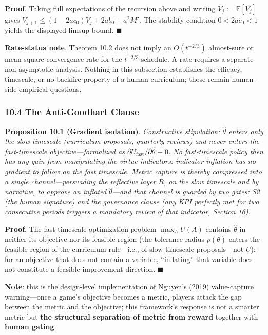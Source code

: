 \documentclass[
  11pt]{article}
\begin{document}
\textbf{Proof}. Taking full expectations of the recursion above and
writing \(\bar V_j:=\mathbb E[V_j]\) gives
\(\bar V_{j+1}\le(1-2ac_0)\bar V_j+2ab_0+a^2M'\). The stability
condition \(0<2ac_0<1\) yields the displayed limsup bound.
\(\blacksquare\)

\textbf{Rate-status note}. Theorem 10.2 does not imply an
\(O(t^{-2/3})\) almost-sure or mean-square convergence rate for the
\(t^{-2/3}\) schedule. A rate requires a separate non-asymptotic
analysis. Nothing in this subsection establishes the efficacy,
timescale, or no-backfire property of a human curriculum; those remain
human-side empirical questions.

\subsubsection{10.4 The Anti-Goodhart
Clause}\label{the-anti-goodhart-clause}

\textbf{Proposition 10.1 (Gradient isolation)}. \emph{Constructive
stipulation: \(\hat\theta\) enters only the slow timescale (curriculum
proposals, quarterly reviews) and never enters the fast-timescale
objective---formalized as
\(\partial U_{\mathrm{fast}}/\partial \hat\theta \equiv 0\). No
fast-timescale policy then has any gain from manipulating the virtue
indicators: indicator inflation has no gradient to follow on the fast
timescale. Metric capture is thereby compressed into a single
channel---persuading the reflective layer \(R\), on the slow timescale
and by narrative, to approve an inflated \(\hat\theta\)---and that
channel is guarded by two gates: S2 (the human signature) and the
governance clause (any KPI perfectly met for two consecutive periods
triggers a mandatory review of that indicator, Section 16).}

\textbf{Proof}. The fast-timescale optimization problem \(\max_A U(A)\)
contains \(\hat\theta\) in neither its objective nor its feasible region
(the tolerance radius \(\rho(\theta)\) enters the feasible region of the
curriculum rule---i.e., of slow-timescale proposals---not \(U\)); for an
objective that does not contain a variable, ``inflating'' that variable
does not constitute a feasible improvement direction. \(\blacksquare\)

\textbf{Note}: this is the design-level implementation of Nguyen's
(2019) value-capture warning---once a game's objective becomes a metric,
players attack the gap between the metric and the objective; this
framework's response is not a smarter metric but \textbf{the structural
separation of metric from reward} together with \textbf{human gating}.
\end{document}
